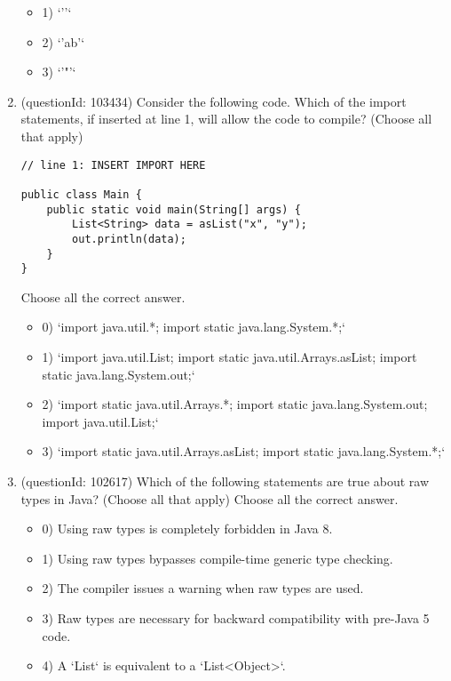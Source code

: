 \documentclass[12pt]{article}
\begin{document}
\begin{enumerate}[label=(\arabic*)]
\begin{itemize}
\item 1) `'\n'`

\item 2) `'ab'`

\item 3) `'"'`

\end{itemize}
\item (questionId: 103434) Consider the following code. Which of the import statements, if inserted at line 1, will allow the code to compile? (Choose all that apply)
\begin{verbatim}
// line 1: INSERT IMPORT HERE

public class Main {
    public static void main(String[] args) {
        List<String> data = asList("x", "y");
        out.println(data);
    }
}
\end{verbatim}
Choose all the correct answer.\begin{itemize}
\item 0) `import java.util.*;
import static java.lang.System.*;`

\item 1) `import java.util.List;
import static java.util.Arrays.asList;
import static java.lang.System.out;`

\item 2) `import static java.util.Arrays.*;
import static java.lang.System.out;
import java.util.List;`

\item 3) `import static java.util.Arrays.asList;
import static java.lang.System.*;`

\end{itemize}
\item (questionId: 102617) Which of the following statements are true about raw types in Java? (Choose all that apply)
Choose all the correct answer.\begin{itemize}
\item 0) Using raw types is completely forbidden in Java 8.

\item 1) Using raw types bypasses compile-time generic type checking.

\item 2) The compiler issues a warning when raw types are used.

\item 3) Raw types are necessary for backward compatibility with pre-Java 5 code.

\item 4) A `List` is equivalent to a `List<Object>`.


\end{itemize}
\end{enumerate}
\end{document}
